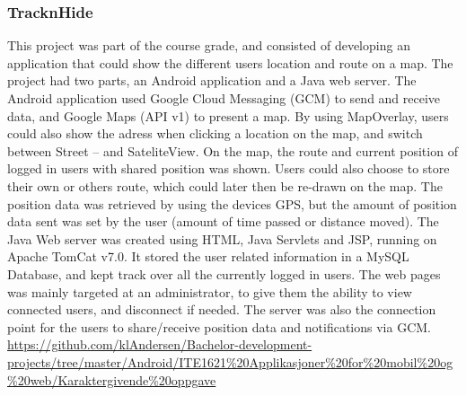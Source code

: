 \subsubsection{TracknHide}
\label{sec:tracknhide}
This project was part of the course grade, and consisted of developing an application that could show the different users location and route on a map. 
The project had two parts, an Android application and a Java web server.
\vspace{0.5em}\newline
The Android application used Google Cloud Messaging (GCM) to send and receive data, and Google Maps (API v1) to present a map. 
By using MapOverlay, users could also show the adress when clicking a location on the map, and switch between Street – and SateliteView. 
On the map, the route and current position of logged in users with shared position was shown. 
Users could also choose to store their own or others route, which could later then be re-drawn on the map. 
The position data was retrieved by using the devices GPS, but the amount of position data sent was set by the user (amount of time passed or distance moved).
\vspace{0.5em}\newline
The Java Web server was created using HTML, Java Servlets and JSP, running on Apache TomCat v7.0. 
It stored the user related information in a MySQL Database, and kept track over all the currently logged in users. 
The web pages was mainly targeted at an administrator, to give them the ability to view connected users, and disconnect if needed. 
The server was also the connection point for the users to share/receive position data and notifications via GCM. 
\clearpage\noindent
{} \url{https://github.com/klAndersen/Bachelor-development-projects/tree/master/Android/ITE1621%20Applikasjoner%20for%20mobil%20og%20web/Karaktergivende%20oppgave} 

